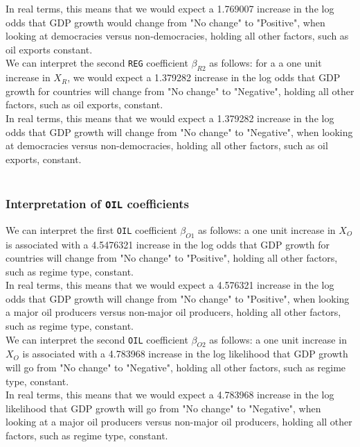 \documentclass[12pt,letterpaper]{article}
\begin{document}
\noindent In real terms, this means that we would expect a 1.769007 increase in the log odds that GDP growth would change from "No change" to "Positive", when looking at democracies versus non-democracies, holding all other factors, such as oil exports constant.
\\

\noindent We can interpret the second \texttt{REG} coefficient $\beta_{R2}$ as follows:  for a a one unit increase in $X_R$, we would expect a 1.379282 increase in the log odds that GDP growth for countries will change from "No change" to "Negative", holding all other factors, such as oil exports, constant.
\\

\noindent In real terms, this means that we would expect a 1.379282 increase in the log odds that GDP growth will change from "No change" to "Negative", when looking at democracies versus non-democracies, holding all other factors, such as oil exports, constant.
\\\\

\subsubsection{Interpretation of \texttt{OIL} coefficients}

\noindent We can interpret the first \texttt{OIL} coefficient $\beta_{O1}$ as follows: a one unit increase in $X_O$ is associated with a 
4.5476321 increase in the log odds that GDP growth for countries will change from "No change" to "Positive", holding all other factors, such as regime type, constant.
\\

\noindent In real terms, this means that we would expect a 4.576321 increase in the log odds that GDP growth will change from "No change" to "Positive", when looking a major oil producers versus non-major oil producers, holding all other factors, such as regime type, constant.
\\

\noindent We can interpret the second \texttt{OIL} coefficient $\beta_{O2}$ as follows: a one unit increase in $X_O$ is associated with a 4.783968 increase in the log likelihood that GDP growth will go from "No change" to "Negative", holding all other factors, such as regime type, constant.
\\

\noindent In real terms, this means that we would expect a 4.783968 increase in the log likelihood that GDP growth will go from "No change" to "Negative", when looking at a major oil producers versus non-major oil producers, holding all other factors, such as regime type, constant. 
\\\\
\end{document}
